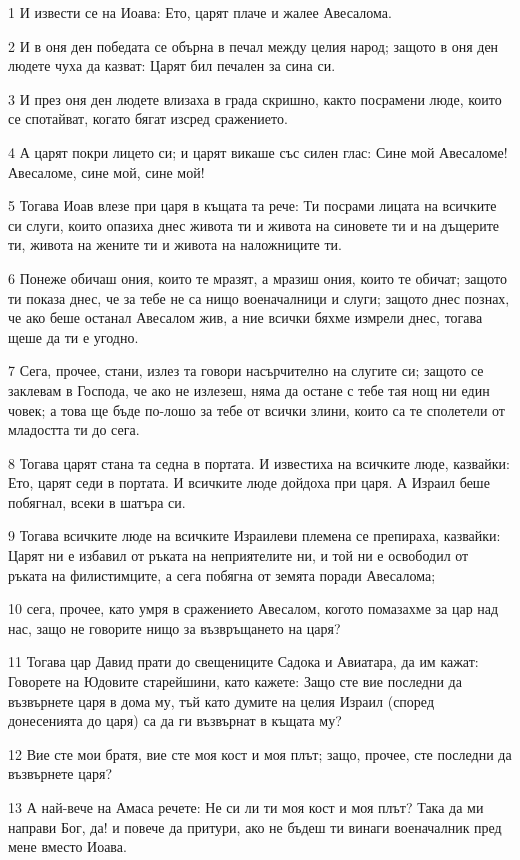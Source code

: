 \par 1 И извести се на Иоава: Ето, царят плаче и жалее Авесалома.
\par 2 И в оня ден победата се обърна в печал между целия народ; защото в оня ден людете чуха да казват: Царят бил печален за сина си.
\par 3 И през оня ден людете влизаха в града скришно, както посрамени люде, които се спотайват, когато бягат изсред сражението.
\par 4 А царят покри лицето си; и царят викаше със силен глас: Сине мой Авесаломе! Авесаломе, сине мой, сине мой!
\par 5 Тогава Иоав влезе при царя в къщата та рече: Ти посрами лицата на всичките си слуги, които опазиха днес живота ти и живота на синовете ти и на дъщерите ти, живота на жените ти и живота на наложниците ти.
\par 6 Понеже обичаш ония, които те мразят, а мразиш ония, които те обичат; защото ти показа днес, че за тебе не са нищо военачалници и слуги; защото днес познах, че ако беше останал Авесалом жив, а ние всички бяхме измрели днес, тогава щеше да ти е угодно.
\par 7 Сега, прочее, стани, излез та говори насърчително на слугите си; защото се заклевам в Господа, че ако не излезеш, няма да остане с тебе тая нощ ни един човек; а това ще бъде по-лошо за тебе от всички злини, които са те сполетели от младостта ти до сега.
\par 8 Тогава царят стана та седна в портата. И известиха на всичките люде, казвайки: Ето, царят седи в портата. И всичките люде дойдоха при царя. А Израил беше побягнал, всеки в шатъра си.
\par 9 Тогава всичките люде на всичките Израилеви племена се препираха, казвайки: Царят ни е избавил от ръката на неприятелите ни, и той ни е освободил от ръката на филистимците, а сега побягна от земята поради Авесалома;
\par 10 сега, прочее, като умря в сражението Авесалом, когото помазахме за цар над нас, защо не говорите нищо за възвръщането на царя?
\par 11 Тогава цар Давид прати до свещениците Садока и Авиатара, да им кажат: Говорете на Юдовите старейшини, като кажете: Защо сте вие последни да възвърнете царя в дома му, тъй като думите на целия Израил (според донесенията до царя) са да ги възвърнат в къщата му?
\par 12 Вие сте мои братя, вие сте моя кост и моя плът; защо, прочее, сте последни да възвърнете царя?
\par 13 А най-вече на Амаса речете: Не си ли ти моя кост и моя плът? Така да ми направи Бог, да! и повече да притури, ако не бъдеш ти винаги военачалник пред мене вместо Иоава.
